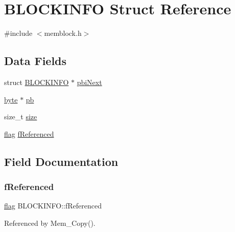 \hypertarget{struct_b_l_o_c_k_i_n_f_o}{}\section{B\+L\+O\+C\+K\+I\+N\+FO Struct Reference}
\label{struct_b_l_o_c_k_i_n_f_o}


{\ttfamily \#include $<$memblock.\+h$>$}

\subsection*{Data Fields}
\begin{DoxyCompactItemize}
\item 
struct \hyperlink{struct_b_l_o_c_k_i_n_f_o}{B\+L\+O\+C\+K\+I\+N\+FO} $\ast$ \hyperlink{struct_b_l_o_c_k_i_n_f_o_a3a3031c99ba0cc062336f8cd80fcfdb6}{pbi\+Next}
\item 
\hyperlink{generic_8h_a0c8186d9b9b7880309c27230bbb5e69d}{byte} $\ast$ \hyperlink{struct_b_l_o_c_k_i_n_f_o_a880ef736b9b6b77c3607e60c34935ab1}{pb}
\item 
size\+\_\+t \hyperlink{struct_b_l_o_c_k_i_n_f_o_a418663a53c4fa4a7611c50b0f4ccdffa}{size}
\item 
\hyperlink{memblock_8h_a920d0054b069504874f34133907c0b42}{flag} \hyperlink{struct_b_l_o_c_k_i_n_f_o_acac311adb5793b084eedee9d61873bb0}{f\+Referenced}
\end{DoxyCompactItemize}


\subsection{Field Documentation}
\mbox{\label{struct_b_l_o_c_k_i_n_f_o_acac311adb5793b084eedee9d61873bb0}} 
\subsubsection{\texorpdfstring{f\+Referenced}{fReferenced}}
{\footnotesize\ttfamily \hyperlink{memblock_8h_a920d0054b069504874f34133907c0b42}{flag} B\+L\+O\+C\+K\+I\+N\+F\+O\+::f\+Referenced}



Referenced by Mem\+\_\+\+Copy().

\mbox{\label{struct_b_l_o_c_k_i_n_f_o_a880ef736b9b6b77c3607e60c34935ab1}} 
